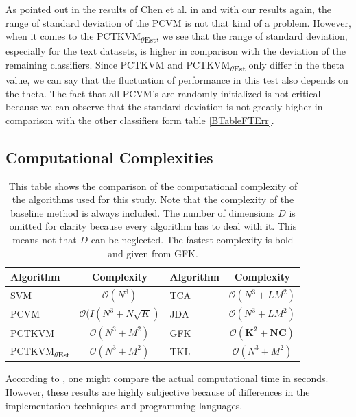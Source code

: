 As pointed out in the results of Chen et al. in \cite{Chen.2009} and with our results again, the range of standard deviation of the \acs{PCVM} is not that kind of a problem. 
However, when it comes to the \acs{PCTKVM}\textsubscript{$\theta$Est}, we see that the range of standard deviation, especially for the text datasets, is higher in comparison with the deviation of the remaining classifiers.
Since \acs{PCTKVM} and \acs{PCTKVM}\textsubscript{$\theta$Est} only differ in the theta value, we can say that the fluctuation of performance in this test also depends on the theta.
The fact that all \acs{PCVM}'s are randomly initialized is not critical because we can observe that the standard deviation is not greatly higher in comparison with the other classifiers form table \ref{BTableFTErr}. 
\FloatBarrier
\subsection{Computational Complexities}\label{EmSubSecTimeResults}
\FloatBarrier
\begin{table}[t]
	\centering
	\begin{tabular}{@{}lclc@{}}
		\toprule
		Algorithm & Complexity & Algorithm & Complexity \\ \midrule
		\acs{SVM}       &    $\mathcal{O}(N^3)$         & \acs{TCA}       &  $\mathcal{O}(N^3+LM^2)$          \\
		\acs{PCVM}      &  $\mathcal{O}(I(N^3+N\sqrt{K})$           & \acs{JDA}      & $\mathcal{O}(N^3+LM^2)$       \\
		\acs{PCTKVM}    &     $\mathcal{O}(N^3+M^2)$        & \acs{GFK}       &  $\mathbf{\mathcal{O}(K^2+NC)}$          \\
		\acs{PCTKVM}\textsubscript{$\theta$Est}    &  $\mathcal{O}(N^3+M^2)$           & \acs{TKL}       &  $\mathcal{O}(N^3+M^2)$          \\ \bottomrule
	\end{tabular}
	\caption[Comparison of Computational Complexities]{This table shows the comparison of the computational complexity of the algorithms used for this study. Note that the complexity of the baseline method is always included. The number of dimensions $D$ is omitted for clarity because every algorithm has to deal with it. This means not that $D$ can be neglected. The fastest complexity is bold and given from \acs{GFK}.\label{TableCompCom}}
\end{table}
According to \cite{Chen.2009}, one might compare the actual computational time in seconds.
However, these results are highly subjective because of differences in the implementation techniques and programming languages.
